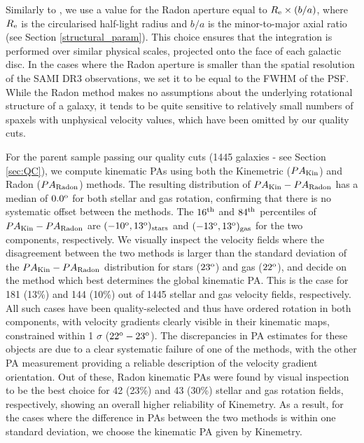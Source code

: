 \documentclass[fleqn,usenatbib]{mnras}
\begin{document}
Similarly to \cite{Stark2018Radon}, we use a value for the Radon aperture equal to $R_{\rm{e}} \times (b/a)$, where $R_{\rm{e}}$ is the circularised half-light radius and $b/a$ is the minor-to-major axial ratio (see Section \ref{structural_param}). This choice ensures that the integration is performed over similar physical scales, projected onto the face of each galactic disc. In the cases where the Radon aperture is smaller than the spatial resolution of the SAMI DR3 observations, we set it to be equal to the FWHM of the PSF. 
While the Radon method makes no assumptions about the underlying rotational structure of a galaxy, it tends to be quite sensitive to relatively small numbers of spaxels with unphysical velocity values, which have been omitted by our quality cuts.  

For the parent sample passing our quality cuts (1445 galaxies - see Section \ref{sec:QC}), we compute kinematic PAs using both the Kinemetric ($PA_{\rm{Kin}}$) and Radon ($PA_{\rm{Radon}}$) methods. The resulting distribution of $PA_{\rm{Kin}}-PA_{\rm{Radon}}$ has a median of $0.0^{\rm{o}}$ for both stellar and gas rotation, confirming that there is no systematic offset between the methods. The $16^{\rm{th}}$ and $84^{\rm{th}}$ percentiles of $PA_{\rm{Kin}}-PA_{\rm{Radon}}$ are $(-10^{\rm{o}},13^{\rm{o}})_{\rm{stars}}$ and $(-13^{\rm{o}},13^{\rm{o}})_{\rm{gas}}$ for the two components, respectively. We visually inspect the velocity fields where the  disagreement between the two methods is larger than the standard deviation of the $PA_{\rm{Kin}}-PA_{\rm{Radon}}$ distribution for stars ($23^{\rm{o}}$) and gas ($22^{\rm{o}}$), and decide on the method which best determines the global kinematic PA. This is the case for 181 (13\%) and 144 (10\%) out of 1445 stellar and gas velocity fields, respectively. All such cases have been quality-selected and thus have ordered rotation in both components, with velocity gradients clearly visible in their kinematic maps, constrained within  1 $\sigma$ ($22^{\rm{o}}-23^{\rm{o}}$). The discrepancies in PA estimates for these objects are due to a clear systematic failure of one of the methods, with the other PA measurement providing a reliable description of the velocity gradient orientation. Out of these, Radon kinematic PAs were found by visual inspection to be the best choice for 42 (23\%) and 43 (30\%) stellar and gas rotation fields, respectively, showing an overall higher reliability of Kinemetry. As a result, for the cases where the difference in PAs between the two methods is within one standard deviation, we choose the kinematic PA given by Kinemetry. 
\end{document}
